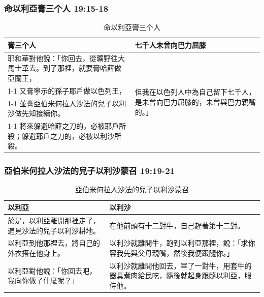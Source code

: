 \subsubsection{命以利亞膏三个人 19:15-18}
\begin{table}[H]
\centering 
{}
\begin{tabular}{p{12.75cm}|p{4.5cm}}\hline\hline
膏三个人&七千人未曾向巴力屈膝\\\hline
耶和華對他說：「你回去，從曠野往大馬士革去。到了那裡，就要膏哈薛做亞蘭王，
&\multirow{4}{4.6cm}{但我在以色列人中為自己留下七千人，是未曾向巴力屈膝的，未曾與巴力親嘴的。」}\\\cline{1-1}
又膏寧示的孫子耶戶做以色列王，&\\\cline{1-1}
並膏亞伯米何拉人沙法的兒子以利沙做先知接續你。 & \\\cline{1-1}
將來躲避哈薛之刀的，必被耶戶所殺；躲避耶戶之刀的，必被以利沙所殺。&\\\hline
\end{tabular}
\caption{命以利亞膏三个人}
\end{table} 


\subsubsection{亞伯米何拉人沙法的兒子以利沙蒙召 19:19-21} 
\begin{table}[H]
\centering 
{}
\begin{tabular}{p{8.75cm}|p{8.5cm}}\hline\hline
以利亞&以利沙\\\hline
於是，以利亞離開那裡走了，遇見沙法的兒子以利沙耕地。
&在他前頭有十二對牛，自己趕著第十二對。\\\hline
以利亞到他那裡去，將自己的外衣搭在他身上。&以利沙就離開牛，跑到以利亞那裡，說：「求你容我先與父母親嘴，然後我便跟隨你。」\\\hline
以利亞對他說：「你回去吧，我向你做了什麼呢？」&以利沙就離開他回去，宰了一對牛，用套牛的器具煮肉給民吃，隨後就起身跟隨以利亞，服侍他。\\\hline
\end{tabular}
\caption{亞伯米何拉人沙法的兒子以利沙蒙召}
\end{table} 


